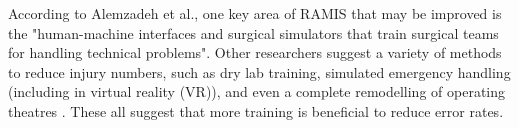 \documentclass[conference]{IEEEtran}
\begin{document}

According to Alemzadeh et al., one key area of RAMIS that may be improved is the "human-machine interfaces and surgical simulators that train surgical teams for handling technical problems". Other researchers suggest a variety of methods to reduce injury numbers, such as dry lab training, simulated emergency handling (including in virtual reality (VR)), and even a complete remodelling of operating theatres \citep{liberman_training_2011, huser_simulated_2014, ahmad_ambulatory_2016, abelson_virtual_2015}. These all suggest that more training is beneficial to reduce error rates.

\end{document}
